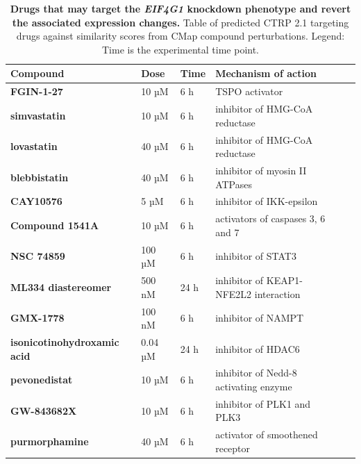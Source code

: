 \begin{table}[!h]
\centering
\footnotesize
\caption[Table of drugs that may target the \emph{EIF4G1} knockdown phenotype]{\textbf{Drugs that may target the \emph{EIF4G1} knockdown phenotype and revert the associated expression changes.} Table of predicted CTRP 2.1 targeting drugs against similarity scores from CMap compound perturbations. Legend: Time is the experimental time point.}
\label{tab:ctrap-target-revert-table}

\begin{tabular}{llllll}
\toprule
\textbf{Compound}                       & \textbf{Dose} & \textbf{Time} & \textbf{Mechanism of action} \\
\midrule
\textbf{FGIN-1-27}                  & 10 µM                & 6 h                  & TSPO activator \\
\textbf{simvastatin}                & 10 µM                & 6 h                  & inhibitor of HMG-CoA reductase                                       \\
\textbf{lovastatin}                 & 40 µM                & 6 h                  & inhibitor of HMG-CoA reductase                                       \\
\textbf{blebbistatin}               & 40 µM                & 6 h                  & inhibitor of myosin II ATPases                                       \\
\textbf{CAY10576}                   & 5 µM                 & 6 h                  & inhibitor of IKK-epsilon                                             \\
\textbf{Compound 1541A}             & 10 µM                & 6 h                  & activators of caspases 3, 6 and 7                    \\
\textbf{NSC 74859}                  & 100 µM               & 6 h                  & inhibitor of STAT3                                                   \\
\textbf{ML334 diastereomer}         & 500 nM               & 24 h                 & inhibitor of KEAP1-NFE2L2 interaction                \\
\textbf{GMX-1778}                   & 100 nM               & 6 h                  & inhibitor of NAMPT                  \\
\textbf{isonicotinohydroxamic acid} & 0.04 µM              & 24 h                 & inhibitor of HDAC6                                                   \\
\textbf{pevonedistat}               & 10 µM                & 6 h                  & inhibitor of Nedd-8 activating enzyme                                \\
\textbf{GW-843682X}                 & 10 µM                & 6 h                  & inhibitor of PLK1 and PLK3                                           \\
\textbf{purmorphamine}              & 40 µM                & 6 h                  & activator of smoothened receptor                                    \\
\bottomrule
\end{tabular}
\end{table}

